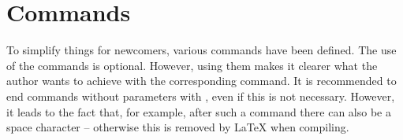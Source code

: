 
\section{Commands}
\label{sec:Commands}

To simplify things for newcomers, various commands have been defined. The use
of the commands is optional. However, using them makes it clearer what the
author wants to achieve with the corresponding command. It is recommended to
end commands without parameters with \tsTextMonospace{\{\}}, even if this is
not necessary. However, it leads to the fact that, for example, after such a
command there can also be a space character -- otherwise this is removed by
\LaTeX{} when compiling.

